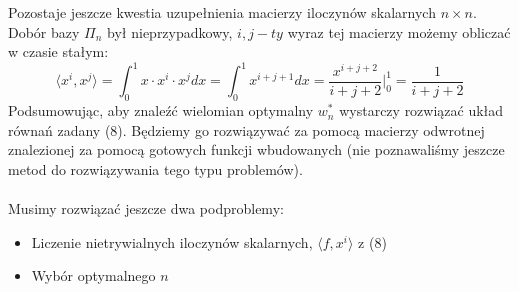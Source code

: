 \documentclass{article}
\begin{document}
Pozostaje jeszcze kwestia uzupełnienia macierzy iloczynów skalarnych $n \times n$.
Dobór bazy $\Pi_n$ był nieprzypadkowy, $i,j-ty$ wyraz tej macierzy możemy obliczać w czasie stałym:
\begin{equation}
\langle x^i,x^j \rangle = \int_0^1 x\cdot x^i \cdot x^j dx = \int_0^1 x^{i+j+1} dx = \frac{x^{i+j+2}}{i+j+2} \Big|_0^1 = \frac{1}{i+j+2}
\end{equation}
Podsumowując, aby znaleźć wielomian optymalny $w^*_n$ wystarczy rozwiązać układ równań zadany (8). Będziemy go rozwiązywać za pomocą macierzy odwrotnej znalezionej za pomocą gotowych funkcji wbudowanych (nie poznawaliśmy jeszcze metod do rozwiązywania tego typu problemów).\\\\
Musimy rozwiązać jeszcze dwa podproblemy:
\begin{itemize}
    \item Liczenie nietrywialnych iloczynów skalarnych, $\langle f,x^i\rangle$ z (8)
    \item Wybór optymalnego $n$
\end{itemize}
\end{document}
